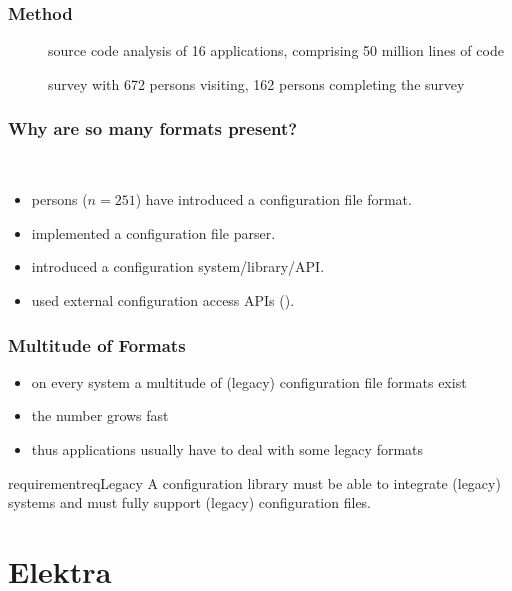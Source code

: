 \begin{frame}
	\frametitle{Method}
	\begin{description}
	\item[\methodSource{}] source code analysis of 16 applications, comprising 50 million lines of code~\cite{raab2017challenges}
	\item[\methodQuestion{}] survey with 672 persons visiting, 162 persons completing the survey~\cite{raab2017challenges}
	\end{description}
\end{frame}

\begin{frame}
	\frametitle{Why are so many formats present?}
	\methodQuestion{} ~\cite{raab2017challenges}
	\begin{itemize}
	\item {} persons ($n=251$) have introduced a configuration file format.
	\item {} implemented a configuration file parser.
	\item {} introduced a configuration system/library/API.
	\item used external configuration access APIs ().
	\end{itemize}
\end{frame}

\begin{frame}
	\frametitle{Multitude of Formats}
	\begin{itemize}
	\item on every system a multitude of (legacy) configuration file formats exist
	\item the number grows fast
	\item thus applications usually have to deal with some legacy formats
	\end{itemize}
	

	\begin{restatable}{requirement}{reqLegacy}
	A configuration library must be able to integrate (legacy) systems and must fully support (legacy) configuration files.%
	\label{req:legacy}
	\end{restatable}
\end{frame}


\section{Elektra}

